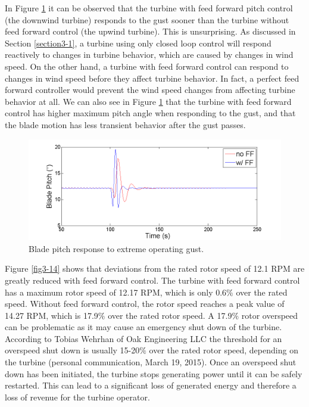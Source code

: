 In Figure \ref{fig3-13} it can be observed that the turbine with feed forward pitch control (the downwind turbine) responds to the gust sooner than the turbine without feed forward control (the upwind turbine). This is unsurprising. As discussed in Section \ref{section3-1}, a turbine using only closed loop control will respond reactively to changes in turbine behavior, which are caused by changes in wind speed. On the other hand, a turbine with feed forward control can respond to changes in wind speed before they affect turbine behavior. In fact, a perfect feed forward controller would prevent the wind speed changes from affecting turbine behavior at all. We can also see in Figure \ref{fig3-13} that the turbine with feed forward control has  higher maximum pitch angle when responding to the gust, and that the blade motion has less transient behavior after the gust passes.

\begin{figure}[htbp]
	\centering
		\includegraphics[width = \linewidth]{Figures/ch3Figures/fig3-13.png}
		
	\caption{Blade pitch response to extreme operating gust. }
	\label{fig3-13}
\end{figure}

Figure \ref{fig3-14} shows that deviations from the rated rotor speed of 12.1 RPM are greatly reduced with feed forward control. The turbine with feed forward control has a maximum rotor speed of 12.17 RPM, which is only 0.6$\%$ over the rated speed. Without feed forward control, the rotor speed reaches a peak value of 14.27 RPM, which is 17.9$\%$ over the rated rotor speed. A 17.9$\%$ rotor overspeed can be problematic as it may cause an emergency shut down of the turbine. According to Tobias Wehrhan of Oak Engineering LLC the threshold for an overspeed shut down is usually 15-20$\%$ over the rated rotor speed, depending on the turbine (personal communication, March 19, 2015). Once an overspeed shut down has been initiated, the turbine stops generating power until it can be safely restarted. This can lead to a significant loss of generated energy and therefore a loss of revenue for the turbine operator.

